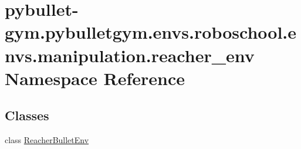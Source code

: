 \hypertarget{namespacepybullet-gym_1_1pybulletgym_1_1envs_1_1roboschool_1_1envs_1_1manipulation_1_1reacher__env}{}\section{pybullet-\/gym.pybulletgym.\+envs.\+roboschool.\+envs.\+manipulation.\+reacher\+\_\+env Namespace Reference}
\label{namespacepybullet-gym_1_1pybulletgym_1_1envs_1_1roboschool_1_1envs_1_1manipulation_1_1reacher__env}
\subsection*{Classes}
\begin{DoxyCompactItemize}
\item 
class \hyperlink{classpybullet-gym_1_1pybulletgym_1_1envs_1_1roboschool_1_1envs_1_1manipulation_1_1reacher__env_1_1_reacher_bullet_env}{Reacher\+Bullet\+Env}
\end{DoxyCompactItemize}
